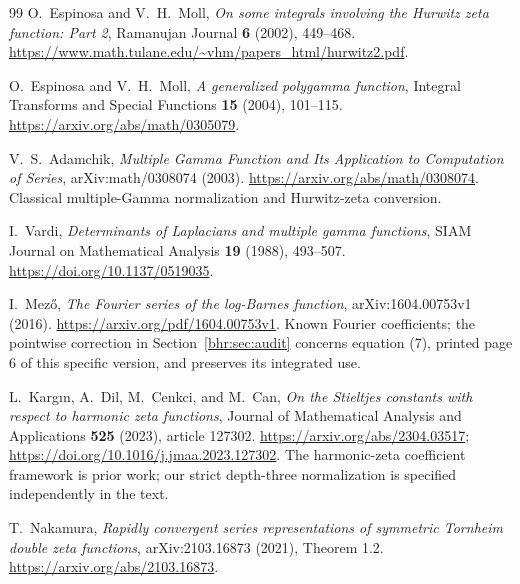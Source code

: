 \begin{thebibliography}{99}
O.~Espinosa and V.~H.~Moll,
\emph{On some integrals involving the Hurwitz zeta function: Part 2},
Ramanujan Journal \textbf{6} (2002), 449--468.
\url{https://www.math.tulane.edu/~vhm/papers_html/hurwitz2.pdf}.

O.~Espinosa and V.~H.~Moll,
\emph{A generalized polygamma function},
Integral Transforms and Special Functions \textbf{15} (2004), 101--115.
\url{https://arxiv.org/abs/math/0305079}.

V.~S.~Adamchik,
\emph{Multiple Gamma Function and Its Application to Computation of Series},
arXiv:math/0308074 (2003).
\url{https://arxiv.org/abs/math/0308074}.
Classical multiple-Gamma normalization and Hurwitz-zeta conversion.

I.~Vardi,
\emph{Determinants of Laplacians and multiple gamma functions},
SIAM Journal on Mathematical Analysis \textbf{19} (1988), 493--507.
\url{https://doi.org/10.1137/0519035}.

I.~Mez\H{o},
\emph{The Fourier series of the log-Barnes function},
arXiv:1604.00753v1 (2016).
\url{https://arxiv.org/pdf/1604.00753v1}.
Known Fourier coefficients; the pointwise correction in
Section~\ref{bhr:sec:audit} concerns equation (7), printed page 6 of this
specific version, and preserves its integrated use.

L.~Karg\i n, A.~Dil, M.~Cenkci, and M.~Can,
\emph{On the Stieltjes constants with respect to harmonic zeta functions},
Journal of Mathematical Analysis and Applications \textbf{525} (2023),
article 127302.
\url{https://arxiv.org/abs/2304.03517};
\url{https://doi.org/10.1016/j.jmaa.2023.127302}.
The harmonic-zeta coefficient framework is prior work; our strict
depth-three normalization is specified independently in the text.

T.~Nakamura,
\emph{Rapidly convergent series representations of symmetric Tornheim
double zeta functions}, arXiv:2103.16873 (2021), Theorem 1.2.
\url{https://arxiv.org/abs/2103.16873}.

\end{thebibliography}
